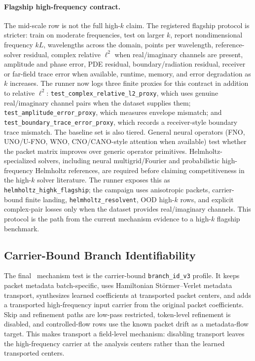 \paragraph{Flagship high-frequency contract.}
The mid-scale row is not the full high-$k$ claim.  The registered flagship protocol is stricter: train on moderate frequencies, test on larger $k$, report nondimensional frequency $kL$, wavelengths across the domain, points per wavelength, reference-solver residual, complex relative $\ell^2$ when real/imaginary channels are present, amplitude and phase error, PDE residual, boundary/radiation residual, receiver or far-field trace error when available, runtime, memory, and error degradation as $k$ increases.  The runner now logs three finite proxies for this contract in addition to relative $\ell^2$: \texttt{test\_complex\_relative\_l2\_proxy}, which uses genuine real/imaginary channel pairs when the dataset supplies them; \texttt{test\_amplitude\_error\_proxy}, which measures envelope mismatch; and \texttt{test\_boundary\_trace\_error\_proxy}, which records a receiver-style boundary trace mismatch.  The baseline set is also tiered.  General neural operators (FNO, UNO/U-FNO, WNO, CNO/CANO-style attention when available) test whether the packet matrix improves over generic operator primitives.  Helmholtz-specialized solvers, including neural multigrid/Fourier and probabilistic high-frequency Helmholtz references, are required before claiming competitiveness in the high-$k$ solver literature.  The runner exposes this as \texttt{helmholtz\_highk\_flagship}; the campaign uses anisotropic packets, carrier-bound finite landing, \texttt{helmholtz\_resolvent}, OOD high-$k$ rows, and explicit complex-pair losses only when the dataset provides real/imaginary channels.  This protocol is the path from the current mechanism evidence to a high-$k$ flagship benchmark.

\subsection{Carrier-Bound Branch Identifiability}

The final \MiNO\ mechanism test is the carrier-bound \texttt{branch\_id\_v3} profile.  It keeps packet metadata batch-specific, uses Hamiltonian St\"ormer--Verlet metadata transport, synthesizes learned coefficients at transported packet centers, and adds a transported high-frequency input carrier from the original packet coefficients.  Skip and refinement paths are low-pass restricted, token-level refinement is disabled, and controlled-flow rows use the known packet drift as a metadata-flow target.  This makes transport a field-level mechanism: disabling transport leaves the high-frequency carrier at the analysis centers rather than the learned transported centers.

